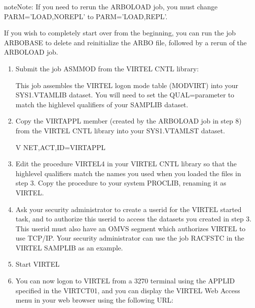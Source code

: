 \documentclass[letterpaper,10pt,english]{sphinxmanual}
\begin{document}
\begin{sphinxadmonition}{note}{Note:}
\sphinxAtStartPar
If you need to rerun the ARBOLOAD job, you must change PARM=’LOAD,NOREPL’ to PARM=’LOAD,REPL’.

\sphinxAtStartPar
If you wish to completely start over from the beginning, you can run the job ARBOBASE to delete and reinitialize the ARBO file, followed by a rerun of the ARBOLOAD job.
\end{sphinxadmonition}
\begin{enumerate}
%
\setcounter{enumi}{7}
\item {} 
\sphinxAtStartPar
Submit the job ASMMOD from the VIRTEL CNTL library:

\sphinxAtStartPar
This job assembles the VIRTEL logon mode table (MODVIRT) into your SYS1.VTAMLIB dataset.  You will need to set the QUAL=parameter to match the high\sphinxhyphen{}level qualifiers of your SAMPLIB dataset.

\item {} 
\sphinxAtStartPar
Copy the VIRTAPPL member (created by the ARBOLOAD job in step 8) from the VIRTEL CNTL library into your SYS1.VTAMLST dataset.
\begin{description}
\sphinxAtStartPar
V NET,ACT,ID=VIRTAPPL

\end{description}

\item {} 
\sphinxAtStartPar
Edit the procedure VIRTEL4 in your VIRTEL CNTL library so that the high\sphinxhyphen{}level qualifiers match the names you used when you loaded the files in step 3.  Copy the procedure to your system PROCLIB, renaming it as VIRTEL.

\item {} 
\sphinxAtStartPar
Ask your security administrator to create a userid for the VIRTEL started task, and to authorize this userid to access the datasets you created in step 3. This userid must also have an OMVS segment which authorizes VIRTEL to use TCP/IP. Your security administrator can use the job RACFSTC in the VIRTEL SAMPLIB as an example.

\item {} 
\sphinxAtStartPar
Start VIRTEL

\item {} 
\sphinxAtStartPar
You can now logon to VIRTEL from a 3270 terminal using the APPLID specified in the VIRTCT01, and you can display the VIRTEL Web Access menu in your web browser using the following URL:


\end{enumerate}
\end{document}

